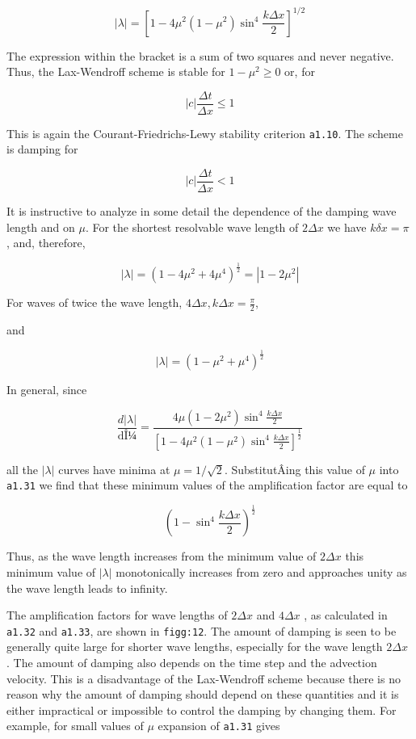 {\[|\lambda| = \left\lbrack  1 - 4\mu^{2}( 1 - \mu^{2} )\sin^{4}\frac{k\Delta x}{2} \right\rbrack^{1/2}\]}

The expression within the bracket is a sum of two squares and never
negative. Thus, the Lax-Wendroff scheme is stable for
\(1 - \mu^{2} \geq 0\) or, for

\[\left| c \right|\frac{\Delta t}{\Delta x} \leq 1\]

This is again the Courant-Friedrichs-Lewy stability criterion
\texttt{a1.10}. The scheme is damping for

\[\left| c  \right|\frac{\Delta t}{\Delta x} < 1\]

It is instructive to analyze in some detail the dependence of the
damping wave length and on \(\mu\). For the shortest resolvable wave
length of \(2\Delta x\) we have \(k\delta x = \pi\) , and, therefore,

 {\[|\lambda|  = \left( 1 - 4\mu^{2} + 4\mu^{4} \right)^{\frac{1}{2}} = \left| 1 - 2\mu^{2} \right|\]}

For waves of twice the wave length,
\(4\Delta x,k\Delta x = \frac{\pi}{2}\),

and

 {\[|\lambda| = \left( 1 - \mu^{2} + \mu^{4} \right)^{\frac{1}{2}}\]}

In general, since

\[\frac{d|\lambda|}{\text{dÎ¼}} = \frac{4\mu\left( 1 - 2\mu^{2} \right)\sin^{4}\frac{k\Delta x}{2}}{\left\lbrack 1 - 4\mu^{2}\left( 1 - \mu^{2} \right)\sin^{4}\frac{k\Delta x}{2} \right\rbrack^{\frac{1}{2}}}\]

all the \(|\lambda|\) curves have minima at \(\mu = 1/\sqrt{2}\).
SubstitutÂ­ing this value of \(\mu\) into \texttt{a1.31} we find that
these minimum values of the amplification factor are equal to

 {\[\left( 1 - \sin^{4}\frac{k\Delta x}{2} \right)^{\frac{1}{2}}\]}

Thus, as the wave length increases from the minimum value of
\(2\Delta x\) this minimum value of \(|\lambda|\) monotonically
increases from zero and approaches unity as the wave length leads to
infinity.

The amplification factors for wave lengths of \(2\Delta x\) and
\(4\Delta x\) , as calculated in \texttt{a1.32} and \texttt{a1.33}, are
shown in \texttt{figg:12}. The amount of damping is seen to be
generally quite large for shorter wave lengths, especially for the wave
length \(2\Delta x\) . The amount of damping also depends on the time
step and the advection velocity. This is a disadvantage of the
Lax-Wendroff scheme because there is no reason why the amount of damping
should depend on these quantities and it is either impractical or
impossible to control the damping by changing them. For example, for
small values of \(\mu\) expansion of \texttt{a1.31} gives

